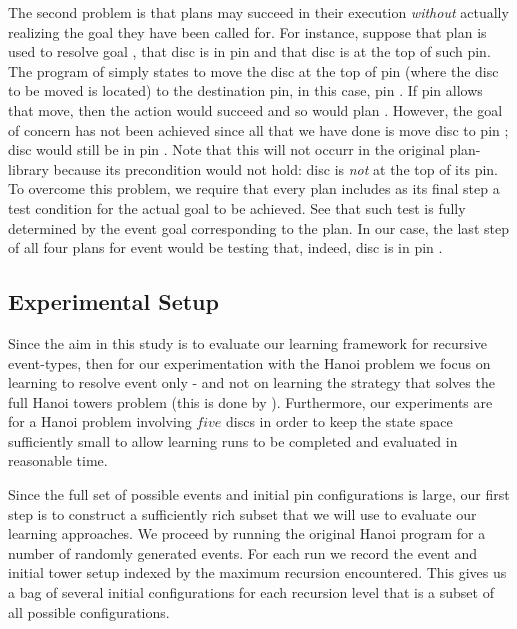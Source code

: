 The second problem is that plans may succeed in their execution \emph{without}
actually realizing the goal they have been called for. For instance, suppose that
plan  is used to resolve goal , that disc
 is in pin  and that disc  is at the top of such
pin. The program of   simply states to move the disc at the
top of pin  (where the disc to be moved is located) to the destination
pin, in this case, pin . If pin  allows that move, then the
action  would succeed and so would plan .
However, the goal of concern has not been achieved since all that we have done is
move disc  to pin ; disc  would still be in pin
. Note that this will not occurr in the original plan-library because
its precondition would not hold: disc  is \emph{not} at the top of its
pin.
To overcome this problem, we require that every plan includes as its final step a
test condition for the actual goal to be achieved. See that such test is fully
determined by the event goal corresponding to the plan. In our case, the last
step of all four plans for event  would be testing that,
indeed, disc  is in pin .

\subsection{Experimental Setup}

Since the aim in this study is to evaluate our learning framework for recursive event-types, then for our experimentation with the Hanoi problem we focus on learning to resolve event  only - and not on learning the strategy that solves the full Hanoi towers problem (this is done by ). Furthermore, our experiments are for a Hanoi problem involving $five$ discs in order to keep the state space sufficiently small to allow learning runs to be completed and evaluated in reasonable time. 

Since the full set of possible  events and initial pin configurations is large, our first step is to construct a sufficiently rich subset that we will use to evaluate our learning approaches. We proceed by running the original Hanoi program for a number of randomly generated  events. For each run we record the  event and initial tower setup indexed by the maximum recursion encountered. This gives us a bag of several initial configurations for each recursion level that is a subset of all possible configurations. 

